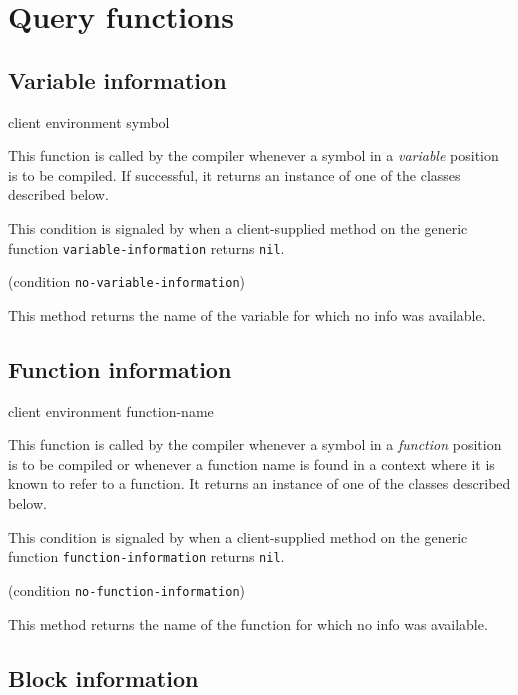 \section{Query functions}

\subsection{Variable information}

 {client environment symbol}

This function is called by the compiler whenever a symbol in a
\emph{variable} position is to be compiled.  If successful, it returns
an instance of one of the classes described below.


This condition is signaled by \sysname{} when a client-supplied method
on the generic function \texttt{variable-information} returns \texttt{nil}.

 {(condition {\tt no-variable-information})}

This method returns the name of the variable for which no info was
available.

\subsection{Function information}

 {client environment function-name}

This function is called by the compiler whenever a symbol in a
\emph{function} position is to be compiled or whenever a function name
is found in a context where it is known to refer to a function.  It
returns an instance of one of the classes described below.


This condition is signaled by \sysname{} when a client-supplied method
on the generic function \texttt{function-information} returns \texttt{nil}.

 {(condition {\tt no-function-information})}

This method returns the name of the function for which no info was
available.

\subsection{Block information}

